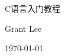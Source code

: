 \begin{titlepage}
    \centering
    \vspace*{3cm} %
    
    {\heiti C语言入门教程 \par} %
    
    \vfill %
    
    {\songti Grant Lee \par} %
    \vspace{0.5cm} %
    {\songti \today \par} %
    
    \vspace*{3cm} %
\end{titlepage}